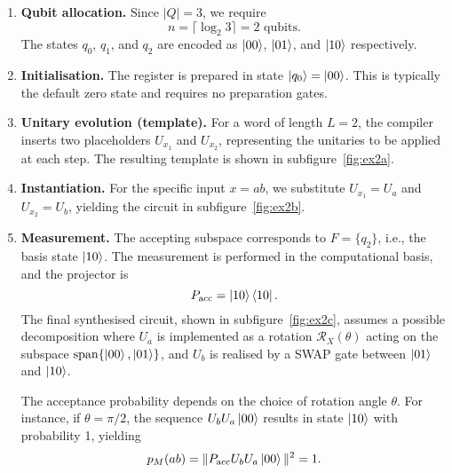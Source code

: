 \begin{enumerate}
  \item \textbf{Qubit allocation.} Since $|Q| = 3$, we require
  \[
  n = \lceil \log_2 3 \rceil = 2 \text{ qubits}.
  \]
  The states $q_0$, $q_1$, and $q_2$ are encoded as $\ket{00}$, $\ket{01}$, and $\ket{10}$ respectively.

  \item \textbf{Initialisation.} The register is prepared in state $\ket{q_0} = \ket{00}$. This is typically the default zero state and requires no preparation gates.

  \item \textbf{Unitary evolution (template).} For a word of length $L = 2$, the compiler inserts two placeholders $\boxed{U_{x_1}}$ and $\boxed{U_{x_2}}$, representing the unitaries to be applied at each step. The resulting template is shown in subfigure~\ref{fig:ex2a}.

  \item \textbf{Instantiation.} For the specific input $x = ab$, we substitute $U_{x_1} = U_a$ and $U_{x_2} = U_b$, yielding the circuit in subfigure~\ref{fig:ex2b}.

  \item \textbf{Measurement.} The accepting subspace corresponds to $F = \{q_2\}$, i.e., the basis state $\ket{10}$. The measurement is performed in the computational basis, and the projector is
  \[
  P_{\text{acc}} = \ket{10}\bra{10}.
  \]
  The final synthesised circuit, shown in subfigure~\ref{fig:ex2c}, assumes a possible decomposition where $U_a$ is implemented as a rotation $\mathcal{R}_X(\theta)$ acting on the subspace $\mathrm{span}\{\ket{00}, \ket{01}\}$, and $U_b$ is realised by a SWAP gate between $\ket{01}$ and $\ket{10}$.

  The acceptance probability depends on the choice of rotation angle $\theta$. For instance, if $\theta = \pi/2$, the sequence $U_b U_a \ket{00}$ results in state $\ket{10}$ with probability 1, yielding
  \[
  p_M(ab) = \|P_{\text{acc}} U_b U_a \ket{00}\|^2 = 1.
  \]
\end{enumerate}

